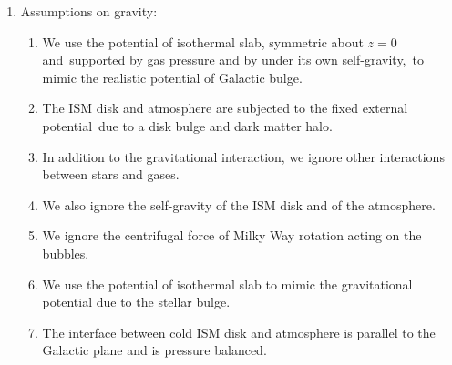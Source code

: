 \documentclass[twocolumn]{aastex631}
\begin{document}
\begin{enumerate}
  \item Assumptions on gravity:
    \begin{enumerate}
      \item We use the potential of isothermal slab, symmetric about $z=0$ and\
            supported by gas pressure and by under its own self-gravity,\
            to mimic the realistic potential of Galactic bulge.
      \item The ISM disk and atmosphere are subjected to the fixed external potential\
            due to a disk bulge and dark matter halo.
      \item In addition to the gravitational interaction, we ignore other interactions between stars and gases.
      \item We also ignore the self-gravity of the ISM disk and of the atmosphere.
      \item We ignore the centrifugal force of Milky Way rotation acting on the bubbles.
      \item We use the potential of isothermal slab to mimic the gravitational potential due to the stellar bulge.
      \item The interface between cold ISM disk and atmosphere is parallel to the Galactic plane and is pressure balanced.
    \end{enumerate}
\end{enumerate}
\end{document}
